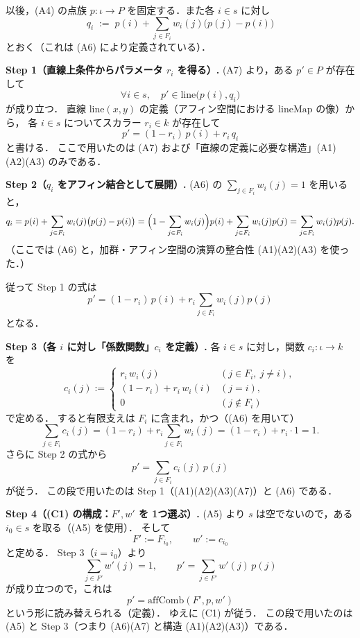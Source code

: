 \documentclass[a4paper,12pt]{bxjsbook}
\makeatletter
\newlength{\customindent}
\theoremstyle{theorem}
\renewenvironment{proof}[1][\proofname]{%
  \par\pushQED{\qed}%
  \normalfont
  \topsep6\p@\@plus6\p@\relax
  \list{}{%
    \leftmargin=\customindent
    \rightmargin=0pt
    \labelwidth=0pt
    \labelsep=0pt
    \itemindent=0pt
    \listparindent=0pt
    \parsep=0pt
  }%
  \item[\itshape #1\@addpunct{.}\hspace{0.5em}]%
  \setlength{\displayindent}{\customindent}%
  \setlength{\displaywidth}{\dimexpr\linewidth-\customindent\relax}%
  \ignorespaces
}{%
  \popQED\endlist\@endpefalse
}
\makeatother
\begin{document}
    \begin{proof}
        以後，(A4) の点族 $p:\iota\to P$ を固定する．また各 $i\in s$ に対し
        \[
          q_i \;:=\; p(i)+\sum_{j\in F_i} w_i(j)\bigl(p(j)-p(i)\bigr)
        \]
        とおく（これは (A6) により定義されている）．
        
        \medskip
        \noindent\textbf{Step 1（直線上条件からパラメータ $r_i$ を得る）.}
        (A7) より，ある $p'\in P$ が存在して
        \[
          \forall i\in s,\quad p'\in \mathrm{line}\bigl(p(i),q_i\bigr)
        \]
        が成り立つ．
        直線 $\mathrm{line}(x,y)$ の定義（アフィン空間における $\mathrm{lineMap}$ の像）から，
        各 $i\in s$ についてスカラー $r_i\in k$ が存在して
        \[
          p'=(1-r_i)\,p(i)+r_i\,q_i
        \]
        と書ける．
        ここで用いたのは (A7) および「直線の定義に必要な構造」(A1)(A2)(A3) のみである．
        
        \medskip
        \noindent\textbf{Step 2（$q_i$ をアフィン結合として展開）.}
        (A6) の $\sum_{j\in F_i} w_i(j)=1$ を用いると，
        \[
          q_i
          =p(i)+\sum_{j\in F_i} w_i(j)\bigl(p(j)-p(i)\bigr)
          =\Bigl(1-\sum_{j\in F_i}w_i(j)\Bigr)p(i)+\sum_{j\in F_i}w_i(j)p(j)
          =\sum_{j\in F_i}w_i(j)p(j).
        \]
        （ここでは (A6) と，加群・アフィン空間の演算の整合性 (A1)(A2)(A3) を使った．）
        
        従って Step 1 の式は
        \[
          p'=(1-r_i)\,p(i)+r_i\sum_{j\in F_i}w_i(j)p(j)
        \]
        となる．
        
        \medskip
        \noindent\textbf{Step 3（各 $i$ に対し「係数関数」$c_i$ を定義）.}
        各 $i\in s$ に対し，関数 $c_i:\iota\to k$ を
        \[
          c_i(j):=
          \begin{cases}
            r_i\,w_i(j) & (j\in F_i,\ j\neq i),\\
            (1-r_i)+r_i\,w_i(i) & (j=i),\\
            0 & (j\notin F_i)
          \end{cases}
        \]
        で定める．
        すると有限支えは $F_i$ に含まれ，かつ（(A6) を用いて）
        \[
          \sum_{j\in F_i}c_i(j)
          =(1-r_i)+r_i\sum_{j\in F_i}w_i(j)
          =(1-r_i)+r_i\cdot 1
          =1.
        \]
        さらに Step 2 の式から
        \[
          p'=\sum_{j\in F_i}c_i(j)\,p(j)
        \]
        が従う．
        この段で用いたのは Step 1（(A1)(A2)(A3)(A7)）と (A6) である．
        
        \medskip
        \noindent\textbf{Step 4（(C1) の構成：$F',w'$ を 1つ選ぶ）.}
        (A5) より $s$ は空でないので，ある $i_0\in s$ を取る（(A5) を使用）．
        そして
        \[
          F':=F_{i_0},\qquad w':=c_{i_0}
        \]
        と定める．
        Step 3（$i=i_0$）より
        \[
          \sum_{j\in F'}w'(j)=1,\qquad
          p'=\sum_{j\in F'}w'(j)\,p(j)
        \]
        が成り立つので，これは
        \[
          p'=\mathrm{affComb}(F',p,w')
        \]
        という形に読み替えられる（定義）．
        ゆえに (C1) が従う．
        この段で用いたのは (A5) と Step 3（つまり (A6)(A7) と構造 (A1)(A2)(A3)）である．
        

\end{proof}
\end{document}
